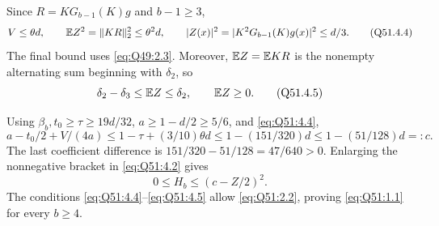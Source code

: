 Since \(R=\allowbreak KG_{b-1}(K)g\) and \(b-1\ge\allowbreak 3\),
\[
V\le\theta d,\qquad
\mathbb E Z^2=\|KR\|_2^2\le\theta^2d,\qquad
|Z(x)|^2=|K^2G_{b-1}(K)g(x)|^2\le d/3.
\tag{Q51.4.4}\label{eq:Q51:4.4}
\]
The final bound uses \eqref{eq:Q49:2.3}.
Moreover, \(\mathbb E Z=\allowbreak \mathbb E KR\) is the nonempty alternating sum beginning with \(\delta_2\), so
\[
\delta_2-\delta_3\le\mathbb E Z\le\delta_2,\qquad \mathbb E Z\ge0.
\tag{Q51.4.5}\label{eq:Q51:4.5}
\]

Using \(\beta_b,\allowbreak t_0\ge\allowbreak \tau\ge\allowbreak 19d/32\), \(a\ge\allowbreak 1-d/2\ge\allowbreak 5/6\), and
\eqref{eq:Q51:4.4},
\[
a-t_0/2+V/(4a)
\le1-\tau+(3/10)\theta d
\le1-(151/320)d
\le1-(51/128)d=:c.
\tag{Q51.4.6}\label{eq:Q51:4.6}
\]
The last coefficient difference is \(151/320-51/128=\allowbreak 47/640>\allowbreak 0\).
Enlarging the nonnegative bracket in \eqref{eq:Q51:4.2} gives
\[
0\le H_b\le(c-Z/2)^2.
\tag{Q51.4.7}\label{eq:Q51:4.7}
\]
The conditions \eqref{eq:Q51:4.4}--\eqref{eq:Q51:4.5} allow
\eqref{eq:Q51:2.2}, proving \eqref{eq:Q51:1.1} for every \(b\ge\allowbreak 4\).

